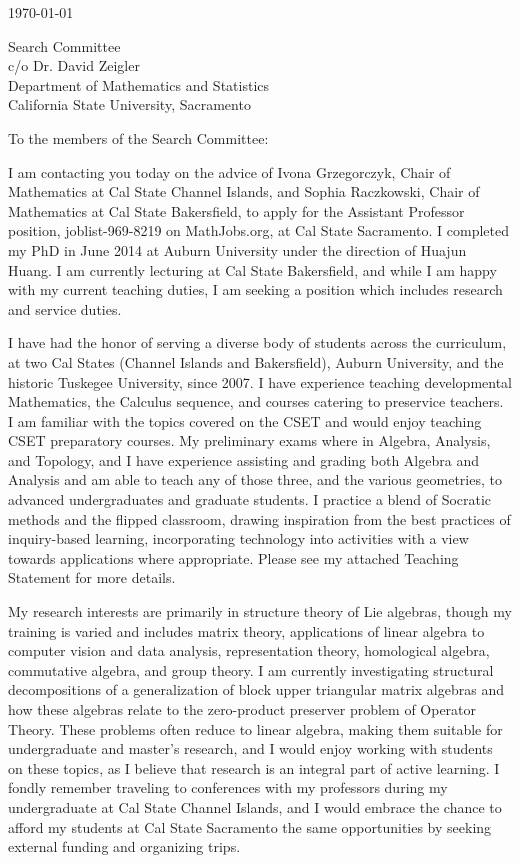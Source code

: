 \documentclass[11pt]{article}
\begin{document}
\makeletterhead

\vfill

\today

\vfill

Search Committee\\
c/o Dr. David Zeigler\\
Department of Mathematics and Statistics\\
California State University, Sacramento

\vfill

To the members of the Search Committee:

\vfill

I am contacting you today on the advice of Ivona Grzegorczyk, Chair of Mathematics at Cal State Channel Islands, and Sophia Raczkowski, Chair of Mathematics at Cal State Bakersfield, to apply for the Assistant Professor position, joblist-969-8219 on MathJobs.org, at Cal State Sacramento.
I completed my PhD in June 2014 at Auburn University under the direction of Huajun Huang. 
I am currently lecturing at Cal State Bakersfield, and while I am happy with my current teaching duties, I am seeking a position which includes research and service duties.

I have had the honor of serving a diverse body of students across the curriculum, at two Cal States (Channel Islands and Bakersfield), Auburn University, and the historic Tuskegee University, since 2007.
I have experience teaching developmental Mathematics, the Calculus sequence, and courses catering to preservice teachers.
I am familiar with the topics covered on the CSET and would enjoy teaching CSET preparatory courses.
My preliminary exams where in Algebra, Analysis, and Topology, and I have experience assisting and grading both Algebra and Analysis and am able to teach any of those three, and the various geometries, to advanced undergraduates and graduate students.
I practice a blend of Socratic methods and the flipped classroom, drawing inspiration from the best practices of inquiry-based learning, incorporating technology into activities with a view towards applications where appropriate.
Please see my attached Teaching Statement for more details.

My research interests are primarily in structure theory of Lie algebras, though my training is varied and includes matrix theory, applications of linear algebra to computer vision and data analysis, representation theory, homological algebra, commutative algebra, and group theory.
I am currently investigating structural decompositions of a generalization of block upper triangular matrix algebras and how these algebras relate to the zero-product preserver problem of Operator Theory.
These problems often reduce to linear algebra, making them suitable for undergraduate and master's research, and I would enjoy working with students on these topics, as I believe that research is an integral part of active learning.
I fondly remember traveling to conferences with my professors during my undergraduate at Cal State Channel Islands, and I would embrace the chance to afford my students at Cal State Sacramento the same opportunities by seeking external funding and organizing trips.
\end{document}
